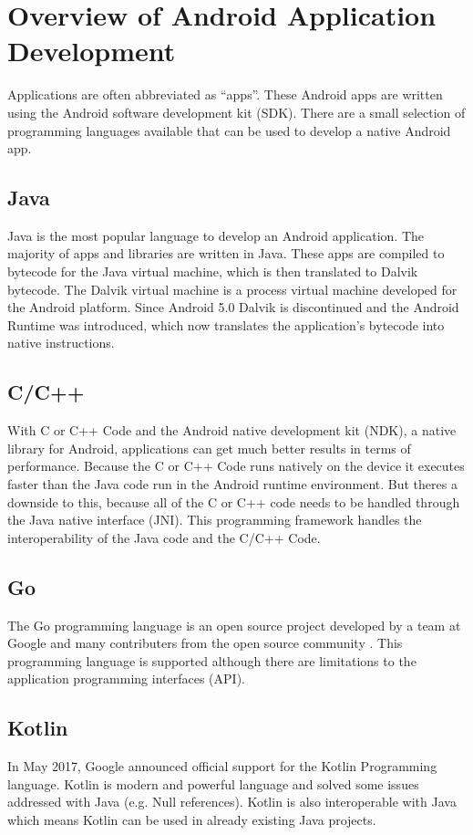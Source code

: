 \section{Overview of Android Application Development}
 Applications are often abbreviated as ``apps''. These Android apps are written using the Android software development kit (SDK). There are a small selection of programming languages available that can be used to develop a native Android app.

\subsection{Java}
Java is the most popular language to develop an Android application. The majority of apps and libraries are written in Java. These apps are compiled to bytecode for the Java virtual machine, which is then translated to Dalvik bytecode. The Dalvik virtual machine is a process virtual machine developed for the Android platform. Since Android 5.0 Dalvik is discontinued and the Android Runtime was introduced, which now translates the application's bytecode into native instructions.

\subsection{C/C++}
With C or C++ Code and the Android native development kit (NDK), a native library for Android, applications can get much better results in terms of performance. Because the C or C++ Code runs natively on the device it executes faster than the Java code run in the Android runtime environment. But theres a downside to this, because all of the C or C++ code needs to be handled through the Java native interface (JNI). This programming framework handles the interoperability of the Java code and the C/C++ Code.
\subsection{Go}
The Go programming language is an open source project developed by a team at Google and many contributers from the open source community \cite{GoProject}. This programming language is supported although there are limitations to the application programming interfaces (API).

\subsection{Kotlin}
In May 2017, Google announced official support for the Kotlin Programming language. Kotlin is modern and powerful language and solved some issues addressed with Java (e.g. Null references). Kotlin is also interoperable with Java which means Kotlin can be used in already existing Java projects.

